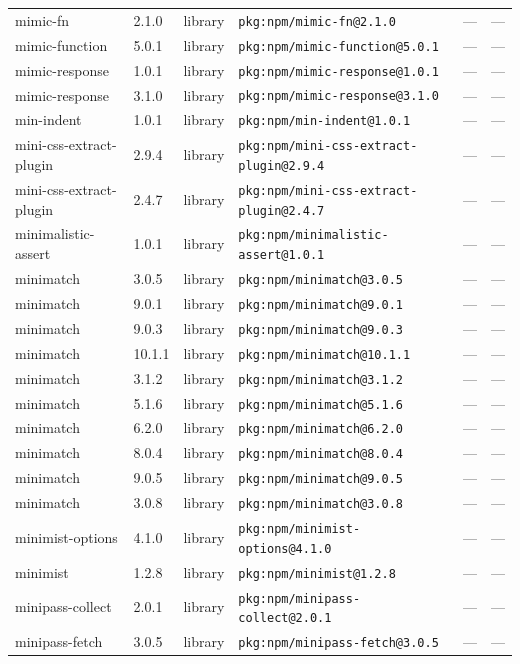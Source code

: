 \documentclass[11pt]{article}
\begin{document}
\begin{longtable}{|l|l|l|p{2.2cm}|l|p{4cm}|}
mimic-fn & 2.1.0 & library & \texttt{pkg:npm/mimic-fn@2.1.0} & — & — \\
mimic-function & 5.0.1 & library & \texttt{pkg:npm/mimic-function@5.0.1} & — & — \\
mimic-response & 1.0.1 & library & \texttt{pkg:npm/mimic-response@1.0.1} & — & — \\
mimic-response & 3.1.0 & library & \texttt{pkg:npm/mimic-response@3.1.0} & — & — \\
min-indent & 1.0.1 & library & \texttt{pkg:npm/min-indent@1.0.1} & — & — \\
mini-css-extract-plugin & 2.9.4 & library & \texttt{pkg:npm/mini-css-extract-plugin@2.9.4} & — & — \\
mini-css-extract-plugin & 2.4.7 & library & \texttt{pkg:npm/mini-css-extract-plugin@2.4.7} & — & — \\
minimalistic-assert & 1.0.1 & library & \texttt{pkg:npm/minimalistic-assert@1.0.1} & — & — \\
minimatch & 3.0.5 & library & \texttt{pkg:npm/minimatch@3.0.5} & — & — \\
minimatch & 9.0.1 & library & \texttt{pkg:npm/minimatch@9.0.1} & — & — \\
minimatch & 9.0.3 & library & \texttt{pkg:npm/minimatch@9.0.3} & — & — \\
minimatch & 10.1.1 & library & \texttt{pkg:npm/minimatch@10.1.1} & — & — \\
minimatch & 3.1.2 & library & \texttt{pkg:npm/minimatch@3.1.2} & — & — \\
minimatch & 5.1.6 & library & \texttt{pkg:npm/minimatch@5.1.6} & — & — \\
minimatch & 6.2.0 & library & \texttt{pkg:npm/minimatch@6.2.0} & — & — \\
minimatch & 8.0.4 & library & \texttt{pkg:npm/minimatch@8.0.4} & — & — \\
minimatch & 9.0.5 & library & \texttt{pkg:npm/minimatch@9.0.5} & — & — \\
minimatch & 3.0.8 & library & \texttt{pkg:npm/minimatch@3.0.8} & — & — \\
minimist-options & 4.1.0 & library & \texttt{pkg:npm/minimist-options@4.1.0} & — & — \\
minimist & 1.2.8 & library & \texttt{pkg:npm/minimist@1.2.8} & — & — \\
minipass-collect & 2.0.1 & library & \texttt{pkg:npm/minipass-collect@2.0.1} & — & — \\
minipass-fetch & 3.0.5 & library & \texttt{pkg:npm/minipass-fetch@3.0.5} & — & — \\

\end{longtable}
\end{document}
